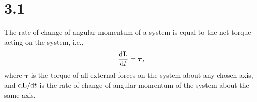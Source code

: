\section{3.1}
\label{sec:3.1}


\begin{prin}
  \label{prin:angularMomentum}
  The rate of change of angular momentum of a system is equal to
  the net torque acting on the system,
  i.e.,
  \begin{equation}
    \frac{\mathrm{d} \mathbf{L}}{\mathrm{d} t} = \boldsymbol\tau,
  \end{equation}
  where $\boldsymbol\tau$ is the torque of all external forces on the system
  about any chosen axis,
  and $\mathrm{d} \mathbf{L}/\mathrm{d} t$ is the rate of change of
  angular momentum of the system about the same axis.
\end{prin}

